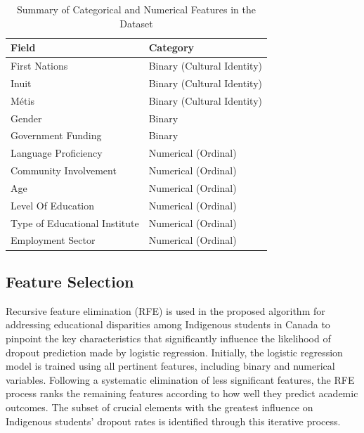 \documentclass[conference]{IEEEtran}
\begin{document}
\begin{table}[t]
  \centering
  \small 
  \caption{Summary of Categorical and Numerical Features in the Dataset}
  \begin{tabularx}{\columnwidth}{|X|X|}
    \hline
    \textbf{Field} & \textbf{Category} \\
    \hline
    First Nations & Binary (Cultural Identity) \\
    \hline
    Inuit & Binary (Cultural Identity) \\
    \hline
    Métis & Binary (Cultural Identity) \\
    \hline
    Gender & Binary \\
    \hline
    Government Funding & Binary \\
    \hline
    Language Proficiency & Numerical (Ordinal) \\
    \hline
    Community Involvement & Numerical (Ordinal) \\
    \hline
    Age & Numerical (Ordinal) \\
    \hline
    Level Of Education & Numerical (Ordinal) \\
    \hline
    Type of Educational Institute & Numerical (Ordinal) \\
    \hline
    Employment Sector & Numerical (Ordinal) \\
    \hline
  \end{tabularx}
\end{table}

\subsection{\textbf{Feature Selection}}
Recursive feature elimination (RFE) \cite{r17} is used in the proposed algorithm
for addressing educational disparities among Indigenous students in Canada
to pinpoint the key characteristics that significantly influence the likelihood of dropout prediction made by logistic regression. Initially, the logistic regression model is trained using all pertinent features, including binary and numerical variables. Following a systematic elimination of less significant features, the RFE process ranks the remaining features according to how well they predict academic outcomes. The subset of crucial elements with the greatest influence on Indigenous students’ dropout rates is identified through this iterative process.
\end{document}
